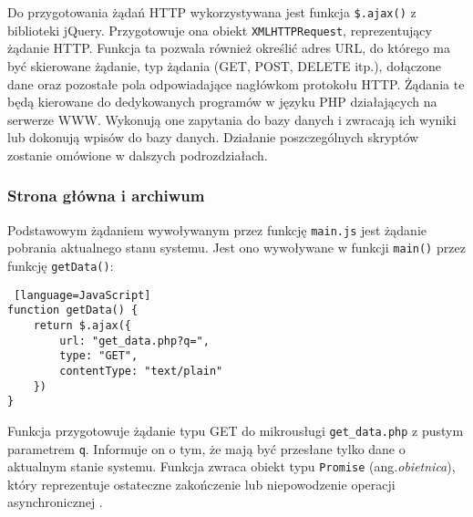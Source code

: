 \documentclass[a4paper,11pt,twoside]{article}
\begin{document}
Do przygotowania żądań HTTP wykorzystywana jest funkcja \texttt{\$.ajax()} z biblioteki jQuery. Przygotowuje ona obiekt \texttt{XMLHTTPRequest}, reprezentujący żądanie HTTP. Funkcja ta pozwala również określić adres URL, do którego ma być skierowane żądanie, typ żądania (GET, POST, DELETE itp.), dołączone dane oraz pozostałe pola odpowiadające nagłówkom protokołu HTTP. Żądania te będą kierowane do dedykowanych programów w języku PHP działających na serwerze WWW. Wykonują one zapytania do bazy danych i zwracają ich wyniki lub dokonują wpisów do bazy danych. Działanie poszczególnych skryptów zostanie omówione w dalszych podrozdziałach.

\subsubsection{Strona główna i archiwum}
Podstawowym żądaniem wywoływanym przez funkcję \texttt{main.js} jest żądanie pobrania aktualnego stanu systemu. Jest ono wywoływane w funkcji \texttt{main()} przez funkcję \texttt{getData()}:
\begin{lstlisting} [language=JavaScript]
function getData() {
    return $.ajax({
        url: "get_data.php?q=",
        type: "GET",
        contentType: "text/plain"
    })
}
\end{lstlisting}
Funkcja przygotowuje żądanie typu GET do mikrousługi \texttt{get{\_}data.php} z pustym parametrem \texttt{q}. Informuje on o tym, że mają być przesłane tylko dane o aktualnym stanie systemu. Funkcja zwraca obiekt typu \texttt{Promise} (ang.\textit{obietnica}), który reprezentuje ostateczne zakończenie lub niepowodzenie operacji asynchronicznej \cite{promise}. 
\end{document}
